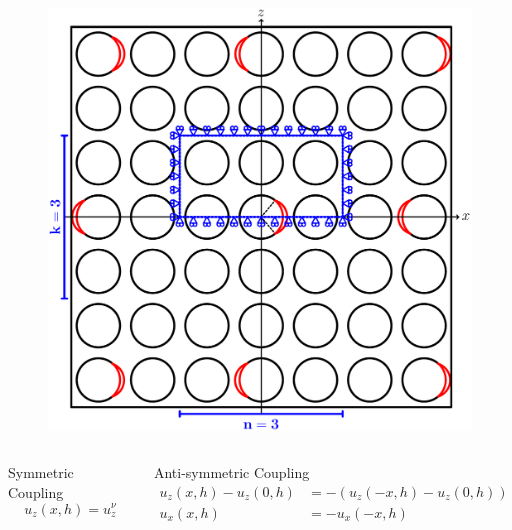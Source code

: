 \documentclass[first,firstsupp,lastsupp,last,hyperref,table]{ETHclass}
\begin{document}
\begin{frame}
\begin{columns}[t]
\begin{column}{0.5\textwidth}
\begin{figure}
\includegraphics[width=0.75\columnwidth]{asymm.pdf}
\end{figure}
\end{column}
\end{columns}
\begin{columns}[t]
\begin{column}{0.45\textwidth}
\centering
\scriptsize
\begin{alertblock}{\scriptsize\centering Symmetric Coupling}
\vspace{-0.25cm}
\begin{equation*}
u_{z}\left(x,h\right)=u^{\nu}_{z}
\end{equation*}
\end{alertblock}
\end{column}
\begin{column}{0.55\textwidth}
\centering
\scriptsize
\begin{alertblock}{\scriptsize\centering Anti-symmetric Coupling}
\vspace{-0.5cm}
\begin{equation*}
\begin{aligned}
u_{z}\left(x,h\right)-u_{z}\left(0,h\right)&=-\left(u_{z}\left(-x,h\right)-u_{z}\left(0,h\right)\right)\\
u_{x}\left(x,h\right)&=-u_{x}\left(-x,h\right)
\end{aligned}
\end{equation*}
\end{alertblock}
\end{column}
\end{columns}
\end{frame}
\end{document}
